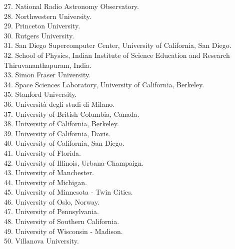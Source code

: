 \documentclass[PICOReport.tex]{subfiles}
\begin{document}
\begin{multicols}{2}
{27. National Radio Astronomy Observatory.  \\
28. Northwestern University.  \\
29. Princeton University.  \\
30. Rutgers University.  \\
31. San Diego Supercomputer Center, University of California, San Diego.  \\
32. School of Physics, Indian Institute of Science Education and Research Thiruvananthapuram,  India.  \\
33. Simon Fraser University.  \\
34. Space Sciences Laboratory, University of California, Berkeley.  \\
35. Stanford University.  \\
36. Universit\`a degli studi di Milano.  \\
37. University of British Columbia, Canada.  \\
38. University of California, Berkeley.  \\
39. University of California, Davis.  \\
40. University of California, San Diego.  \\
41. University of Florida.  \\
42. University of Illinois, Urbana-Champaign.  \\
43. University of Manchester.  \\
44. University of Michigan.  \\
45. University of Minnesota - Twin Cities.  \\
46. University of Oslo, Norway.  \\
47. University of Pennsylvania.  \\
48. University of Southern California.  \\
49. University of Wisconsin - Madison.  \\
50. Villanova University.  
}
\end{multicols}
\end{document}
